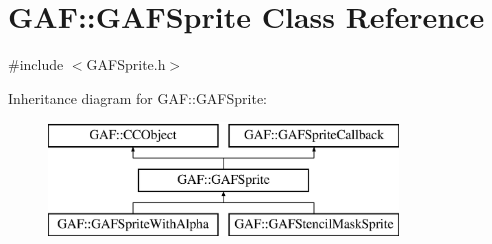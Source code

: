 \hypertarget{class_g_a_f_1_1_g_a_f_sprite}{\section{G\-A\-F\-:\-:G\-A\-F\-Sprite Class Reference}
\label{class_g_a_f_1_1_g_a_f_sprite}
}


{\ttfamily \#include $<$G\-A\-F\-Sprite.\-h$>$}

Inheritance diagram for G\-A\-F\-:\-:G\-A\-F\-Sprite\-:\begin{figure}[H]
\begin{center}
\leavevmode
\includegraphics[height=3.000000cm]{class_g_a_f_1_1_g_a_f_sprite}
\end{center}
\end{figure}
